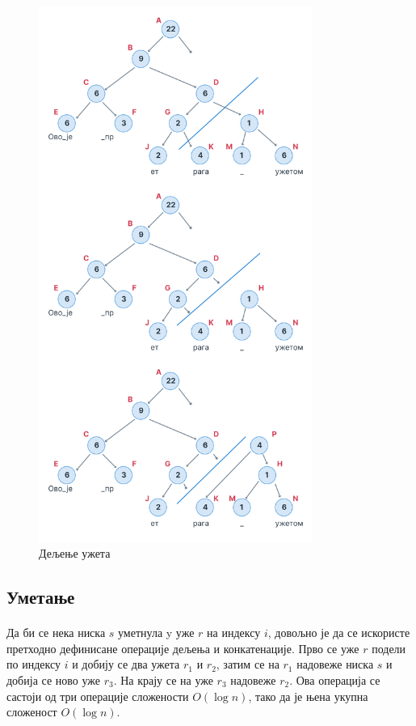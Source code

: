 \documentclass[12pt,oneside]{memoir}
\begin{document}
\begin{figure}
  \centering
  \includegraphics[width=0.8\textwidth]{images/rope_split_1.png}
  \caption{Дељење ужета}
  \label{fig:ropе_split}
\end{figure} 

\subsection{Уметање}
\paragraph{}
Да би се нека ниска \(s\) уметнула y уже \(r\) на индексу \(i\), довољно је да се искористе претходно дефинисане операције дељења и конкатенације. Прво се уже \(r\) подели по индексу \(i\)
и добију се два ужета \(r_1\) и \(r_2\), затим се на \(r_1\) надовеже ниска \(s\) и добија се
ново уже \(r_3\). На крају се на уже \(r_3\) надовеже \(r_2\). Ова операција се састоји
од три операције сложености \(O(\log{}n)\), тако да је њена укупна сложеност \(O(\log{}n)\).
\end{document}
